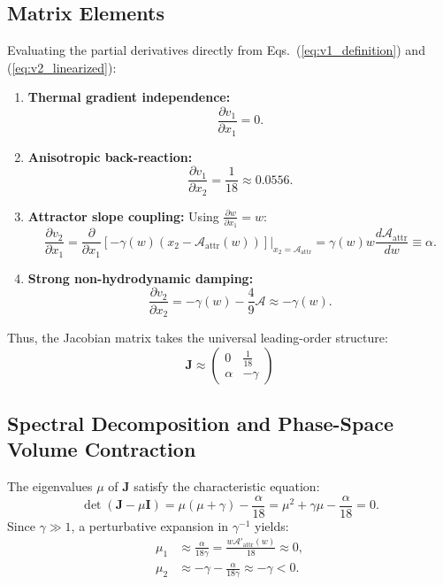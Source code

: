 \documentclass[11pt,a4paper]{article}
\begin{document}
\subsection{Matrix Elements}
Evaluating the partial derivatives directly from Eqs.~(\ref{eq:v1_definition}) and (\ref{eq:v2_linearized}):
\begin{enumerate}
    \item \textbf{Thermal gradient independence:}
    \begin{equation}
        \frac{\partial v_1}{\partial x_1} = 0.
    \end{equation}
    \item \textbf{Anisotropic back-reaction:}
    \begin{equation}
        \frac{\partial v_1}{\partial x_2} = \frac{1}{18} \approx 0.0556.
    \end{equation}
    \item \textbf{Attractor slope coupling:} Using $\frac{\partial w}{\partial x_1} = w$:
    \begin{equation}
        \frac{\partial v_2}{\partial x_1} = \frac{\partial}{\partial x_1}\left[-\gamma(w)(x_2 - \mathcal{A}_{\mathrm{attr}}(w))\right] \bigg|_{x_2 = \mathcal{A}_{\mathrm{attr}}} = \gamma(w) w \frac{d\mathcal{A}_{\mathrm{attr}}}{dw} \equiv \alpha.
    \end{equation}
    \item \textbf{Strong non-hydrodynamic damping:}
    \begin{equation}
        \frac{\partial v_2}{\partial x_2} = -\gamma(w) - \frac{4}{9}\mathcal{A} \approx -\gamma(w).
    \end{equation}
\end{enumerate}
Thus, the Jacobian matrix takes the universal leading-order structure:
\begin{equation}
    \boxed{\mathbf{J} \approx \begin{pmatrix} 0 & \frac{1}{18} \\ \alpha & -\gamma \end{pmatrix}}
    \label{eq:jacobian_form}
\end{equation}

\subsection{Spectral Decomposition and Phase-Space Volume Contraction}
The eigenvalues $\mu$ of $\mathbf{J}$ satisfy the characteristic equation:
\begin{equation}
    \det(\mathbf{J} - \mu\mathbf{I}) = \mu(\mu + \gamma) - \frac{\alpha}{18} = \mu^2 + \gamma\mu - \frac{\alpha}{18} = 0.
\end{equation}
Since $\gamma \gg 1$, a perturbative expansion in $\gamma^{-1}$ yields:
\begin{align}
    \mu_1 &\approx \frac{\alpha}{18\gamma} = \frac{w \mathcal{A}'_{\mathrm{attr}}(w)}{18} \approx 0, \label{eq:eigenvalue_1}\\
    \mu_2 &\approx -\gamma - \frac{\alpha}{18\gamma} \approx -\gamma < 0. \label{eq:eigenvalue_2}
\end{align}
\end{document}
